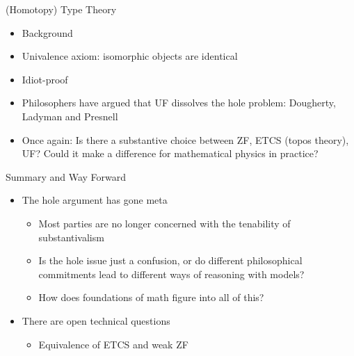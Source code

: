 \documentclass{beamer}
\begin{document}
\begin{frame}{(Homotopy) Type Theory}

  \begin{itemize}
  \item Background
  \item Univalence axiom: isomorphic objects are identical
  \item Idiot-proof
  \item Philosophers have argued that UF dissolves the hole problem:
    Dougherty, Ladyman and Presnell
  \item Once again: Is there a substantive choice between ZF, ETCS
    (topos theory), UF? Could it make a difference for mathematical
    physics in practice?
  \end{itemize}

\end{frame}

\begin{frame}{Summary and Way Forward}

  \begin{itemize}
  \item The hole argument has gone meta
    \begin{itemize}
    \item Most parties are no longer concerned with the tenability of
      substantivalism
    \item Is the hole issue just a confusion, or do different
      philosophical commitments lead to different ways of reasoning
      with models?
    \item How does foundations of math figure into all of this?
    \end{itemize}
  \item There are open technical questions
    \begin{itemize}
    \item Equivalence of ETCS and weak ZF
    \end{itemize}


  \end{itemize}



\end{frame}
\end{document}
